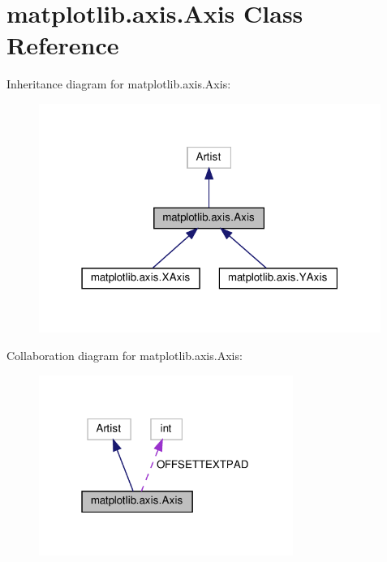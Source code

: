 \hypertarget{classmatplotlib_1_1axis_1_1Axis}{}\section{matplotlib.\+axis.\+Axis Class Reference}
\label{classmatplotlib_1_1axis_1_1Axis}


Inheritance diagram for matplotlib.\+axis.\+Axis\+:
\nopagebreak
\begin{figure}[H]
\begin{center}
\leavevmode
\includegraphics[width=316pt]{classmatplotlib_1_1axis_1_1Axis__inherit__graph}
\end{center}
\end{figure}


Collaboration diagram for matplotlib.\+axis.\+Axis\+:
\nopagebreak
\begin{figure}[H]
\begin{center}
\leavevmode
\includegraphics[width=235pt]{classmatplotlib_1_1axis_1_1Axis__coll__graph}
\end{center}
\end{figure}
